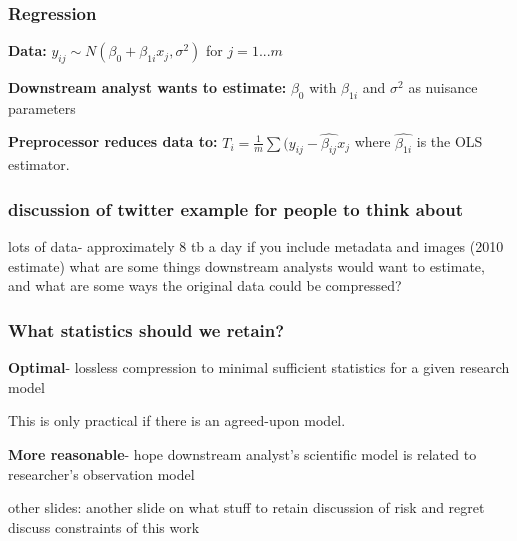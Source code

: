 \documentclass[10pt, compress]{beamer}
\begin{document}
\begin{frame}[fragile]
    \frametitle{Regression}
    
    \textbf{Data:} $y_{ij} \sim N(\beta_0 + \beta_{1i}x_j, \sigma^2)$ for $j = 1...m$
    
    \textbf{Downstream analyst wants to estimate:} $\beta_0$ with $\beta_{1i}$ and $\sigma^2$ as nuisance parameters
    
    \textbf{Preprocessor reduces data to:} $T_i = \frac{1}{m}\sum(y_{ij} - \hat{\beta_{ij}}x_j$ where $\hat{\beta_{1i}}$ is the OLS estimator.

\end{frame}

\begin{frame}[fragile]
    \frametitle{discussion of twitter example for people to think about}

 lots of data- approximately 8 tb a day if you include metadata and images (2010 estimate)
 what are some things downstream analysts would want to estimate, and what are some ways the original data could be compressed?
\end{frame}

\begin{frame}[fragile]
    \frametitle{What statistics should we retain?}
    

    \textbf{Optimal}- lossless compression to minimal sufficient statistics for a given research model
    
    This is only practical if there is an agreed-upon model. 
    
    \textbf{More reasonable}- hope downstream analyst's scientific model is related to researcher's observation model 

\end{frame}

\begin{frame}[fragile]

    other slides:
    another slide on what stuff to retain
    discussion of risk and regret
    discuss constraints of this work


\end{frame}
\end{document}
